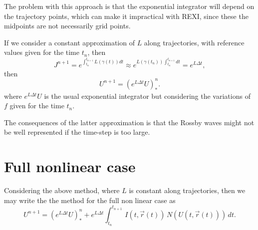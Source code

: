 \documentclass[10pt,a4paper]{article}
\begin{document}
The problem with this approach is that the exponential integrator will depend on the trajectory points, which can make it impractical with REXI, since these the midpoints are not necessarily grid points. 

If we consider a constant approximation of $L$ along trajectories, with reference values given for the time $t_n$, then 
\begin{equation}
J^{n+1}=e^{\int_{t_n}^{t_{n+1}}L(\gamma(t))dt} \approx e^{L(\gamma(t_n))\int_{t_n}^{t_{n+1}}dt} = e^{L \Delta t},
\end{equation}
then
\begin{equation}
U^{n+1}=(e^{L \Delta t} U)^{n}_{*}.
\end{equation}
where $e^{L \Delta t} U$ is the usual exponential integrator but considering the variations of $f$ given for the time $t_n$. 

The consequences of the latter approximation is that the Rossby waves might not be well represented if the time-step is too large.






\section{Full nonlinear case}

Considering the above method, where $L$ is constant along trajectories, then we may write the the method for the full non linear case as 
\begin{equation}
U^{n+1}=(e^{L \Delta t} U)^{n}_{*}+e^{L\Delta t}\int_{t_n}^{t_{n+1}} \, I(t, \vec{r}(t))\, N(U(t, \vec{r}(t)))\,dt.
\end{equation}
\end{document}
